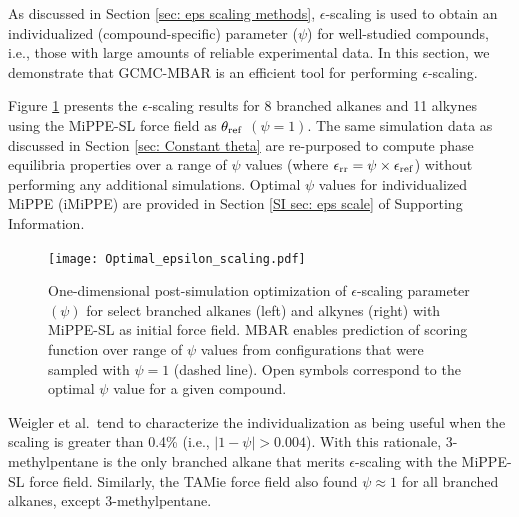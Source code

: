 \documentclass[journal=jced,manuscript=article]{achemso}
\begin{document}

As discussed in Section \ref{sec: eps scaling methods}, $\epsilon$-scaling is used to obtain an individualized (compound-specific) parameter ($\psi$) for well-studied compounds, i.e., those with large amounts of reliable experimental data. \cite{Weidler2018} In this section, we demonstrate that GCMC-MBAR is an efficient tool for performing $\epsilon$-scaling. 


Figure \ref{fig:epsilon_scaling} presents the $\epsilon$-scaling results for 8 branched alkanes and 11 alkynes using the MiPPE-SL force field as $\theta_{\rm ref}$ $(\psi = 1)$. The same simulation data as discussed in Section \ref{sec: Constant theta} are re-purposed to compute phase equilibria properties over a range of $\psi$ values (where $\epsilon_{\rm rr} = \psi \times \epsilon_{\rm ref}$) without performing any additional simulations. Optimal $\psi$ values for individualized MiPPE (iMiPPE) are provided in Section \ref{SI sec: eps scale} of Supporting Information. 

	\begin{figure}[htb!]
		\centering
		\texttt{[image: Optimal\_epsilon\_scaling.pdf]}
		\caption{One-dimensional post-simulation optimization of $\epsilon$-scaling parameter $(\psi)$ for select branched alkanes (left) and alkynes (right) with MiPPE-SL as initial force field. MBAR enables prediction of scoring function over range of $\psi$ values from configurations that were sampled with $\psi = 1$ (dashed line). Open symbols correspond to the optimal $\psi$ value for a given compound.}
		\label{fig:epsilon_scaling}
	\end{figure}

Weigler et al.~tend to characterize the individualization as being useful when the scaling is greater than 0.4\% (i.e., $|1 - \psi| > 0.004$).\cite{Weidler2018} With this rationale, 3-methylpentane is the only branched alkane that merits $\epsilon$-scaling with the MiPPE-SL force field. Similarly, the TAMie force field also found $\psi \approx 1$ for all branched alkanes, except 3-methylpentane. 
\end{document}
